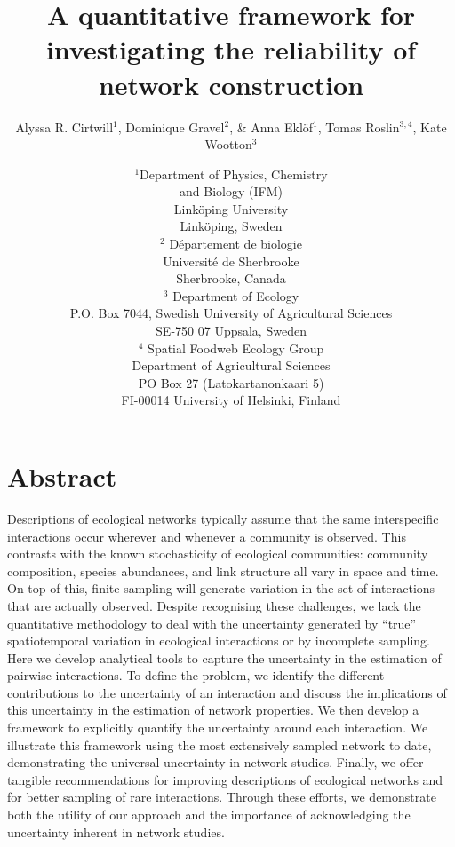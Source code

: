 \documentclass[12pt]{article}
\title{A quantitative framework for investigating the reliability of network construction}
\author{Alyssa R. Cirtwill$^{1}$, Dominique Gravel$^{2}$, \&  Anna Ekl\"{o}f$^{1}$, Tomas Roslin$^{3,4}$, Kate Wootton$^{3}$}
\date{\small$^1$Department of Physics, Chemistry\\ 
and Biology (IFM)\\ 
Link\"{o}ping University\\
Link\"{o}ping, Sweden\\
\medskip$^2$ Département de biologie\\ 
Université de Sherbrooke\\ 
Sherbrooke, Canada\\ 
\medskip $^3$ Department of Ecology\\ P.O. Box 7044, Swedish University of Agricultural Sciences \\ SE-750 07 Uppsala, Sweden \\
\medskip $^4$ Spatial Foodweb Ecology Group\\ Department of Agricultural Sciences \\ PO Box 27 (Latokartanonkaari 5)\\ FI-00014 University of Helsinki, Finland \\
}
\begin{document}
 
\maketitle 
\raggedright
\setlength{\parindent}{15pt} 


\section*{Abstract}

  Descriptions of ecological networks typically assume that the same interspecific interactions occur wherever and whenever a community is observed. This contrasts with the known stochasticity of ecological communities: community composition, species abundances, and link structure all vary in space and time. On top of this, finite sampling will generate variation in the set of interactions that are actually observed. Despite recognising these challenges, we lack the quantitative methodology to deal with the uncertainty generated by “true” spatiotemporal variation in ecological interactions or by incomplete sampling. Here we develop analytical tools to capture the uncertainty in the estimation of pairwise interactions. To define the problem, we identify the different contributions to the uncertainty of an interaction and discuss the implications of this uncertainty in the estimation of network properties. We then develop a framework to explicitly quantify the uncertainty around each interaction. We illustrate this framework using the most extensively sampled network to date, demonstrating the universal uncertainty in network studies. Finally, we offer tangible recommendations for improving descriptions of ecological networks and for better sampling of rare interactions. Through these efforts, we demonstrate both the utility of our approach and the importance of acknowledging the uncertainty inherent in network studies.


\end{document}
